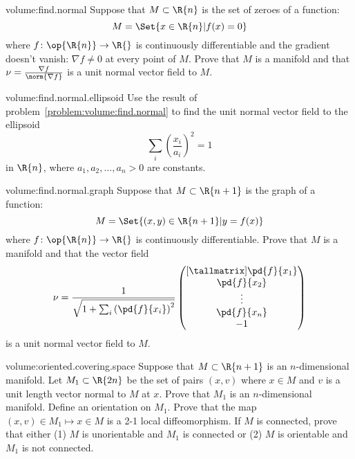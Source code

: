 \begin{problem}{volume:find.normal}
Suppose that \(M \subset \R{n}\) is the set of zeroes of a function:
\[
M = \Set{x \in \R{n}|f(x)=0}
\]
where \(f \colon \op{\R{n}} \to \R{}\) is continuously differentiable and the gradient doesn't vanish: \(\nabla f \ne 0\) at every point of \(M\). 
Prove that \(M\) is a manifold and that \(\nu = \frac{\nabla f}{\norm{\nabla f}}\) is a unit normal vector field to \(M\).
\end{problem}

\begin{problem}{volume:find.normal.ellipsoid}
Use the result of problem~\ref{problem:volume:find.normal} to find the unit normal vector field to the ellipsoid
\[
\sum_i \left(\frac{x_i}{a_i}\right)^2 = 1
\]
in \(\R{n}\), where \(a_1, a_2, \dots, a_n > 0\) are constants.
\end{problem}

\begin{problem}{volume:find.normal.graph}
Suppose that \(M \subset \R{n+1}\) is the graph of a function:
\[
M = \Set{(x,y) \in \R{n+1}|y=f(x)}
\]
where \(f \colon \op{\R{n}} \to \R{}\) is continuously differentiable.
Prove that \(M\) is a manifold and that the vector field
\[
\nu = \frac{1}{\sqrt{1+\sum_i \left(\pd{f}{x_i}\right)^2}}
\begin{pmatrix}[\tallmatrix]
\pd{f}{x_1} \\
\pd{f}{x_2} \\
\vdots \\
\pd{f}{x_{n}} \\
-1
\end{pmatrix}
\]
is a unit normal vector field to \(M\).
\end{problem}

\begin{problem*}{volume:oriented.covering.space}
Suppose that \(M \subset \R{n+1}\) is an \(n\)-dimensional manifold. 
Let \(M_1 \subset \R{2n}\) be the set of pairs \((x,v)\) where \(x \in M\) and \(v\) is a unit length vector normal to \(M\) at \(x\). 
Prove that \(M_1\) is an \(n\)-dimensional manifold. 
Define an orientation on \(M_1\). 
Prove that the map \((x,v) \in M_1 \mapsto x \in M\) is a 2-1 local diffeomorphism.
If \(M\) is connected, prove that either (1) \(M\) is unorientable and \(M_1\) is connected or (2) \(M\) is orientable and \(M_1\) is not connected.
\end{problem*}


